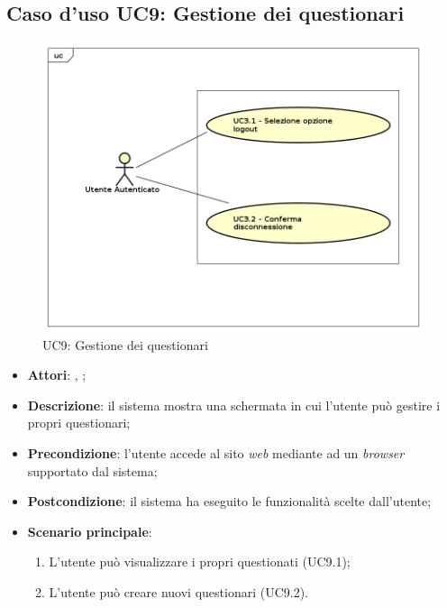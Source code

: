 \subsection{Caso d'uso UC9: Gestione dei questionari}
\label{UC9}
\begin{figure}[h]
	\centering
	\includegraphics[scale=0.5,keepaspectratio]{UML/UC9.png}
	\caption{UC9: Gestione dei questionari}
\end{figure}
\FloatBarrier
\begin{itemize}
	\item \textbf{Attori}: \uau, \uaupro;
	\item \textbf{Descrizione}: il sistema mostra una schermata in cui l'utente può gestire i propri questionari; 
	\item \textbf{Precondizione}: l'utente accede al sito \textit{web} mediante ad un \textit{browser} supportato dal sistema;
	\item \textbf{Postcondizione}: il sistema ha eseguito le funzionalità scelte dall'utente;
	\item \textbf{Scenario principale}:
		\begin{enumerate}
			\item L'utente può visualizzare i propri questionati (UC9.1);
			\item L'utente può creare nuovi questionari (UC9.2).
		\end{enumerate}
\end{itemize}

